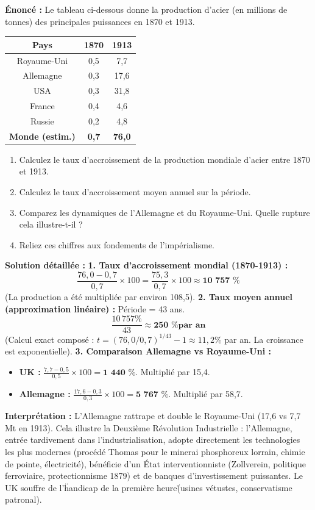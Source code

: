 \documentclass[11pt]{article}
\newcommand{\cle}[1]{{\popxbold\color{popdark}#1}}
\begin{document}
\begin{exoresolu}
\textbf{Énoncé :} Le tableau ci-dessous donne la production d'acier (en millions de tonnes) des principales puissances en 1870 et 1913.
\begin{center}
\begin{tabular}{|c|c|c|}
\hline
\textbf{Pays} & \textbf{1870} & \textbf{1913} \\
\hline
Royaume-Uni & 0,5 & 7,7 \\
Allemagne & 0,3 & 17,6 \\
USA & 0,3 & 31,8 \\
France & 0,4 & 4,6 \\
Russie & 0,2 & 4,8 \\
\hline
\textbf{Monde (estim.)} & \textbf{0,7} & \textbf{76,0} \\
\hline
\end{tabular}
\end{center}
\begin{enumerate}
    \item Calculez le taux d'accroissement de la production mondiale d'acier entre 1870 et 1913.
    \item Calculez le taux d'accroissement moyen annuel sur la période.
    \item Comparez les dynamiques de l'Allemagne et du Royaume-Uni. Quelle rupture cela illustre-t-il ?
    \item Reliez ces chiffres aux fondements de l'impérialisme.
\end{enumerate}
\tcblower
\textbf{Solution détaillée :}
\textbf{1. Taux d'accroissement mondial (1870-1913) :}
\[ \frac{76{,}0 - 0{,}7}{0{,}7} \times 100 = \frac{75{,}3}{0{,}7} \times 100 \approx \textbf{10 757 \%} \]
(La production a été multipliée par environ 108,5).
\textbf{2. Taux moyen annuel (approximation linéaire) :}
Période = 43 ans.
\[ \frac{10\,757\%}{43} \approx \textbf{250 \% par an} \]
(Calcul exact composé : $t = (76{,}0/0{,}7)^{1/43} - 1 \approx 11{,}2\%$ par an. La croissance est exponentielle).
\textbf{3. Comparaison Allemagne vs Royaume-Uni :}
\begin{itemize}
    \item \textbf{UK :} $\frac{7{,}7-0{,}5}{0{,}5} \times 100 = \textbf{1 440 \%}$. Multiplié par 15,4.
    \item \textbf{Allemagne :} $\frac{17{,}6-0{,}3}{0{,}3} \times 100 = \textbf{5 767 \%}$. Multiplié par 58,7.
\end{itemize}
\textbf{Interprétation :} L'Allemagne rattrape et double le Royaume-Uni (17,6 vs 7,7 Mt en 1913). Cela illustre la \cle{Deuxième Révolution Industrielle} : l'Allemagne, entrée tardivement dans l'industrialisation, adopte directement les technologies les plus modernes (procédé Thomas pour le minerai phosphoreux lorrain, chimie de pointe, électricité), bénéficie d'un État interventionniste (Zollverein, politique ferroviaire, protectionnisme 1879) et de banques d'investissement puissantes. Le UK souffre de l'\"handicap de la première heure\" (usines vétustes, conservatisme patronal).

\end{exoresolu}
\end{document}
